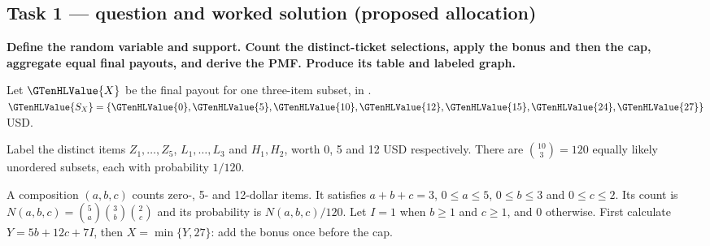\subsection*{Task 1 --- question and worked solution (proposed allocation) }
\label{sol:q6t1}

\noindent\textbf{\boldmath Define the random variable and support. Count the distinct-ticket selections, apply the bonus and then the cap, aggregate equal final payouts, and derive the PMF. Produce its table and labeled graph.}\par\nopagebreak

Let $\GTenHLValue{X}$ be the final payout for one three-item subset, in . $\GTenHLValue{S_X}=\{\GTenHLValue{0},\GTenHLValue{5},\GTenHLValue{10},\GTenHLValue{12},\GTenHLValue{15},\GTenHLValue{24},\GTenHLValue{27}\}$ USD.

Label the distinct items $Z_1,\ldots,Z_5$, $L_1,\ldots,L_3$ and $H_1,H_2$, worth 0, 5 and 12 USD respectively. There are $\binom{10}3=120$ equally likely unordered subsets, each with probability $1/120$.

A composition $(a,b,c)$ counts zero-, 5- and 12-dollar items. It satisfies $a+b+c=3$, $0\leq a\leq 5$, $0\leq b\leq 3$ and $0\leq c\leq 2$. Its count is $N(a,b,c)=\binom{5}a\binom{3}b\binom{2}c$ and its probability is $N(a,b,c)/120$. Let $I=1$ when $b\geq1$ and $c\geq1$, and 0 otherwise. First calculate $Y=5b+12c+7I$, then $X=\min\{Y,27\}$: add the bonus once before the cap.

